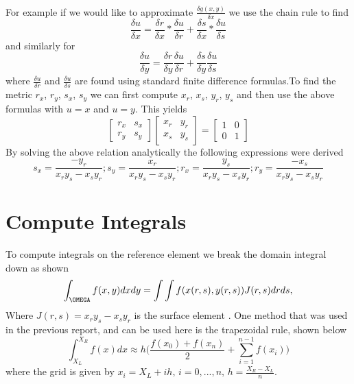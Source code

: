 \documentclass[12pt]{article}
\theoremstyle{definition}
\theoremstyle{definition}
\begin{document}
\\
For example if we would like to approximate \(\frac{\delta g(x,y)}{\delta x}\) we use the chain rule to find
\[
\frac{\delta u}{\delta x} = \frac{\delta r}{\delta x} *\frac{\delta u}{\delta r} +\frac{\delta s}{\delta x} *\frac{\delta u}{\delta s} 
\]
and similarly for
\[
\frac{\delta u}{\delta y} = \frac{\delta r}{\delta y} \frac{\delta u}{\delta r} +\frac{\delta s}{\delta y} \frac{\delta u}{\delta s} 
\]
where \(\frac{\delta u}{\delta r}\) and \(\frac{\delta u}{\delta s}\) are found using standard finite difference formulas.To find the metric \(r_{x}\), \(r_{y}\), \(s_{x}\), \(s_{y}\) we can first compute \(x_{r}\), \(x_{s}\), \(y_{r}\), \(y_{s}\) and then use the above formulas with \(u=x\) and \(u=y\). This yields
\[
\begin{bmatrix}
    r_{x}       & s_{x} \\
    r_{y}       & s_{y}
\end{bmatrix}
\begin{bmatrix}
    x_{r}       & y_{r} \\
    x_{s}       & y_{s}
\end{bmatrix}
=
\begin{bmatrix}
    1       & 0 \\
    0       & 1
\end{bmatrix}
\]
By solving the above relation analytically the following expressions were derived
\[
s_{x}=\frac{-y_{r}}{x_{r}y_{s}-x_{s}y_{r}}; s_{y}=\frac{x_{r}}{x_{r}y_{s}-x_{s}y_{r}}; r_{x}=\frac{y_{s}}{x_{r}y_{s}-x_{s}y_{r}}; r_{y}=\frac{-x_{s}}{x_{r}y_{s}-x_{s}y_{r}}
\]

\section{Compute Integrals}
To compute integrals on the reference element we break the domain integral down as shown
\[
\int_{\OMEGA}f(x,y)dxdy=\int\int f(x(r,s),y(r,s))J(r,s)drds,
\]
Where \(J(r,s)=x_{r}y_{s}-x_{s}y_{r}\) is the surface element \cite{HW}. One method that was used in the previous report, and can be used here is the trapezoidal rule, shown below
\[
\int_{X_{L}}^{X_R}f(x)dx\approx h\bigg(\frac{f(x_{0})+f(x_{n})}{2}+\sum_{i=1}^{n-1}f(x_{i})\bigg)
\]
where the grid is given by \(x_{i}=X_{L}+ih\text{, }i=0,...,n\text{, }h=\frac{X_{R}-X_{L}}{n}\).
\end{document}
